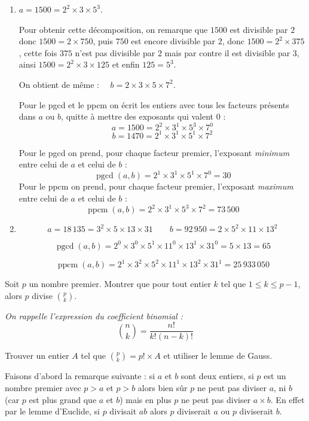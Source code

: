 \documentclass[11pt,class=report,crop=false]{standalone}
\newcommand{\pgcd}{\mathop{\mathrm{pgcd}}\nolimits}
\newcommand{\ppcm}{\mathop{\mathrm{ppcm}}\nolimits}
\begin{document}
\correction
\sauteligne
\begin{enumerate}
    \item     
    $a=1500 = 2^2 \times 3 \times 5^3$.
    
    Pour obtenir cette décomposition, on remarque que $1500$ est divisible par $2$ donc
    $1500 = 2 \times 750$, puis $750$ est encore divisible par $2$, donc $1500 = 2^2 \times 375$, cette fois $375$ n'est pas divisible par $2$ mais par contre il est divisible par $3$, ainsi $1500 = 2^2 \times 3 \times 125$ et enfin $125=5^3$.
    
    On obtient de même : $\quad b = 2\times 3 \times 5 \times 7^2$.
    
    Pour le pgcd et le ppcm on écrit les entiers avec tous les facteurs présents dans $a$ ou $b$, quitte à mettre des exposants qui valent $0$ :
    $$a=1500 = 2^2 \times 3^1 \times 5^3  \times 7^0$$
    $$b = 1470 = 2^1\times 3^1 \times 5^1 \times 7^2$$
    
    Pour le pgcd on prend, pour chaque facteur premier, l'exposant \emph{minimum} entre celui de $a$ et celui de $b$ :
    $$\pgcd(a,b)=2^1\times 3^1 \times 5^1 \times 7^0 = 30$$
    Pour le ppcm on prend, pour chaque facteur premier, l'exposant \emph{maximum} entre celui de $a$ et celui de $b$ :
    $$\ppcm(a,b)=2^2\times 3^1 \times 5^3 \times 7^2 = 73\,500$$    
    
    \item
    $$a = 18\,135 = 3^2 \times 5 \times 13 \times 31 \qquad b = 92\,950 = 2 \times 5^2 \times 11 \times 13^2$$
    
    $$\pgcd(a,b)=2^0\times 3^0 \times 5^1 \times 11^0 \times 13^1 \times 31^0 = 5 \times 13 =65$$
     
    $$\ppcm(a,b)=2^1\times 3^2 \times 5^2 \times 11^1 \times 13^2 \times 31^1 = 25\,933\,050$$   
   
\end{enumerate}
\fincorrection
\finexercice



\exercice{}
\enonce
Soit $p$ un nombre premier. Montrer que pour tout entier $k$ tel que $1 \leq k \leq p-1$, alors $p$ divise $\binom{p}{k}$.

\textit{On rappelle l'expression du coefficient binomial :}
$$ \binom{n}{k} = \frac{n!}{k!(n-k)!}$$
\finenonce

\indication
Trouver un entier $A$ tel que $\binom{p}{k} = p! \times A$ et utiliser le lemme de Gauss.
\finindication

\correction
Faisons d'abord la remarque suivante : si $a$ et $b$ sont deux entiers, si $p$ est un nombre premier avec $p>a$ et $p>b$ alors bien sûr $p$ ne peut pas diviser $a$, ni $b$ (car $p$ est plus grand que $a$ et $b$) mais en plus $p$ ne peut pas diviser $a \times b$. En effet par le lemme d'Euclide, si $p$ divisait $ab$ alors $p$ diviserait $a$ ou $p$ diviserait $b$.
\end{document}
